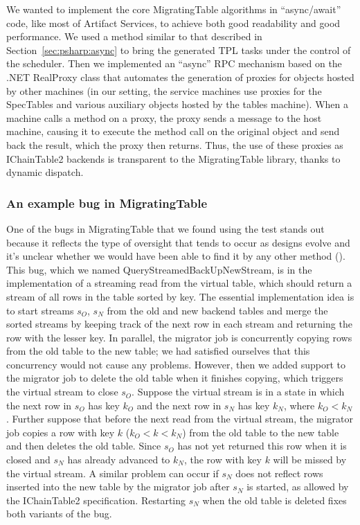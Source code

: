 We wanted to implement the core MigratingTable algorithms in \csharp ``async/await'' code, like most of Artifact Services, to achieve both good readability and good performance.  We used a method similar to that described in Section~\ref{sec:psharp:async} to bring the generated TPL tasks under the control of the \psharp scheduler.  Then we implemented an ``async'' RPC mechanism based on the .NET RealProxy class that automates the generation of proxies for objects hosted by other \psharp machines (in our setting, the service machines use proxies for the SpecTables and various auxiliary objects hosted by the tables machine).  When a machine calls a method on a proxy, the proxy sends a \psharp message to the host machine, causing it to execute the method call on the original object and send back the result, which the proxy then returns.  Thus, the use of these proxies as IChainTable2 backends is transparent to the MigratingTable library, thanks to dynamic dispatch.

\subsubsection{An example bug in MigratingTable}

One of the bugs in MigratingTable that we found using the \psharp test stands out because it reflects the type of oversight that tends to occur as designs evolve and it's unclear whether we would have been able to find it by any other method ().  This bug, which we named QueryStreamedBackUpNewStream, is in the implementation of a streaming read from the virtual table, which should return a stream of all rows in the table sorted by key.  The essential implementation idea is to start streams $s_O$, $s_N$ from the old and new backend tables and merge the sorted streams by keeping track of the next row in each stream and returning the row with the lesser key.  In parallel, the migrator job is concurrently copying rows from the old table to the new table; we had satisfied ourselves that this concurrency would not cause any problems.  However, then we added support to the migrator job to delete the old table when it finishes copying, which triggers the virtual stream to close $s_O$.  Suppose the virtual stream is in a state in which the next row in $s_O$ has key $k_O$ and the next row in $s_N$ has key $k_N$, where $k_O < k_N$.  Further suppose that before the next read from the virtual stream, the migrator job copies a row with key $k$ ($k_O < k < k_N$) from the old table to the new table and then deletes the old table.  Since $s_O$ has not yet returned this row when it is closed and $s_N$ has already advanced to $k_N$, the row with key $k$ will be missed by the virtual stream.  A similar problem can occur if $s_N$ does not reflect rows inserted into the new table by the migrator job after $s_N$ is started, as allowed by the IChainTable2 specification.  Restarting $s_N$ when the old table is deleted fixes both variants of the bug.

